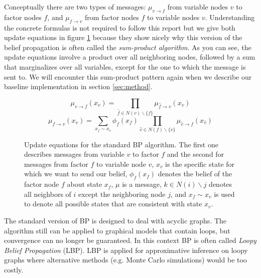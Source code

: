 Conceptually there are two types of messages: $\mu_{v\rightarrow f}$ from variable nodes $v$ to factor nodes $f$, and $\mu_{f\rightarrow v}$ from factor nodes $f$ to variable nodes $v$. Understanding the concrete formulas is not required to follow this report but we give both update equations in figure \ref{eqn:bp_message} because they show nicely why this version of the belief propagation is often called the \textit{sum-product algorithm}. As you can see, the update equations involve a product over all neighboring nodes, followed by a sum that marginalizes over all variables, except for the one to which the message is sent to. We will encounter this sum-product pattern again when we describe our baseline implementation in section \ref{sec:method}.

\begin{figure}
\label{eqn:bp_message}
\begin{equation*}                                                            
\mu_{v\rightarrow f}(x_v) = \prod_{\hat f \in N(v)\backslash \{f\}} \mu_{\hat f\rightarrow v}(x_v)
\end{equation*}
\begin{equation*}                                                            
\mu_{f\rightarrow v}(x_v) = \sum_{x_f \sim x_v}\phi_f(x_f) \prod_{\hat v \in N(f)\backslash \{v\}} \mu_{\hat v\rightarrow f}(x_{\hat v})
\end{equation*}
\caption{Update equations for the standard BP algorithm. The first one describes messages from variable $v$ to factor $f$ and the second for messages from factor $f$ to variable node $v$, $x_v$ is the specific state for which we want to send our belief, $\phi_f(x_f)$ denotes the belief of the factor node $f$ about state $x_f$, $\mu$ is a message, $k \in N(i)\backslash j$ denotes all neighbors of $i$ except the neighboring node $j$, and $x_f \sim x_v$ is used to denote all possible states that are consistent with state $x_v$.}
\end{figure}

The standard version of BP is designed to deal with acyclic graphs. The algorithm still can be applied to graphical models that contain loops, but convergence can no longer be guaranteed. In this context BP is often called \textit{Loopy Belief Propagation} (LBP). LBP is applied for approximative inference on loopy graphs where alternative methods (e.g. Monte Carlo simulations) would be too costly. 

